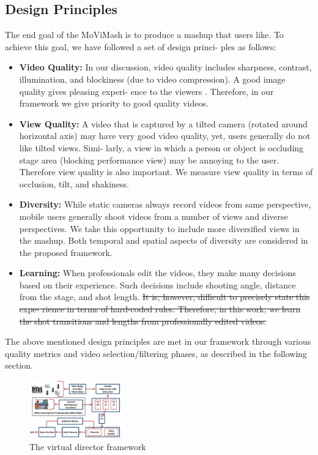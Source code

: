 \documentclass{sig-alternate}
\providecommand{\DIFadd}[1]{{\protect\color{blue}\uwave{#1}}} %
\providecommand{\DIFdel}[1]{{\protect\color{red}\sout{#1}}}                      %
\providecommand{\DIFaddbegin}{} %
\providecommand{\DIFaddend}{} %
\providecommand{\DIFdelbegin}{} %
\providecommand{\DIFdelend}{} %
\begin{document}
\subsection{Design Principles}
The end goal of the MoViMash is to produce a mashup that users
like. To achieve this goal, we have followed a set of design princi-
ples as follows:
\begin{itemize}
\item \textbf{Video Quality:} In our discussion, video quality includes
sharpness, contrast, illumination, and blockiness (due to video
compression). A good image quality gives pleasing experi-
ence to the viewers \cite{10}. Therefore, in our framework we
give priority to good quality videos.
\item \textbf{View Quality:} A video that is captured by a tilted camera
(rotated around horizontal axis) may have very good video
quality, yet, users generally do not like tilted views. Simi-
larly, a view in which a person or object is occluding stage
area (blocking performance view) may be annoying to the user. Therefore view quality is also important. We measure
view quality in terms of occlusion, tilt, and shakiness.
\item \textbf{Diversity:} While static cameras always record videos from
same perspective, mobile users generally shoot videos from
a number of views and diverse perspectives. We take this
opportunity to include more diversified views in the mashup.
Both temporal and spatial aspects of diversity are considered
in the proposed framework.
\item \textbf{Learning:} When professionals edit the videos, they make
many decisions based on their experience. Such decisions
include shooting angle, distance from the stage, and shot
length. \DIFdelbegin \DIFdel{It is, however, difficult to precisely state this expe-
rience in terms of hard-coded rules. Therefore, in this work,
we learn the shot transitions and lengths from professionally
edited videos.
}\DIFdelend \DIFaddbegin \DIFadd{this is item
}\DIFaddend \end{itemize}
The above mentioned design principles are met in our framework
through various quality metrics and video selection/filtering phases,
as described in the following section.

\begin{figure}[htp]
\centering
\includegraphics[width=4cm]{images/img2.png}
\caption{The virtual director framework}
\end{figure}
\end{document}
